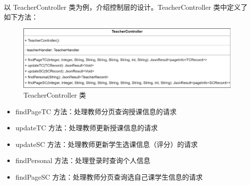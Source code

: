 \documentclass[12pt, a4paper]{article}
\begin{document}
以 TeacherController 类为例，介绍控制层的设计。TeacherController 类中定义了如下方法：
\begin{figure}[H]
	\centering
	\includegraphics[width = 0.9 \textwidth]{TeacherController.png}
	\caption{TeacherController 类}
\end{figure}
\begin{itemize}
	\item findPageTC 方法：处理教师分页查询授课信息的请求
	\item updateTC 方法：处理教师更新授课信息的请求
	\item updateSC 方法：处理教师更新学生选课信息（评分）的请求
	\item findPersonal 方法：处理登录时查询个人信息
	\item findPageSC 方法：处理教师分页查询选自己课学生信息的请求
\end{itemize}
\end{document}
